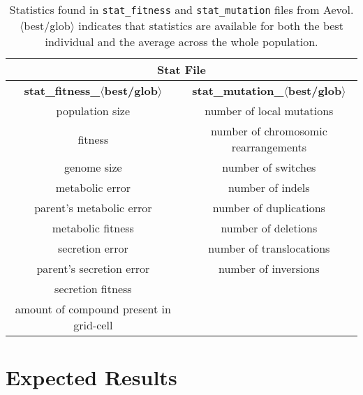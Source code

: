 \begin{table}[H]
	\centering
	\begin{tabular}{ |c|c| }
		\hline
		\multicolumn{2}{|c|}{\textbf{Stat File}} \\
		\hline
		\textbf{stat\_fitness\_$\langle$best/glob$\rangle$} &
		\textbf{stat\_mutation\_$\langle$best/glob$\rangle$} \\
		\hline \hline
		population size & number of local mutations \\
		fitness & number of chromosomic rearrangements \\
		genome size & number of switches \\
		metabolic error & number of indels \\
		parent's metabolic error & number of duplications \\
		metabolic fitness & number of deletions \\
		secretion error & number of translocations \\
		parent's secretion error & number of inversions \\
		secretion fitness & \\ 
		amount of compound present in grid-cell & \\
		\hline
	\end{tabular}	
	\caption[Aevol's stats: fitness and mutation]{Statistics found in \texttt{stat\_fitness} and \texttt{stat\_mutation} files from Aevol. $\langle$best/glob$\rangle$ indicates that statistics are available for both the best individual and the average across the whole population.}
	\label{table:aevol_stats_fitness_and_mutation}
\end{table}
 
\section{Expected Results}\label{sec:expected_results}

